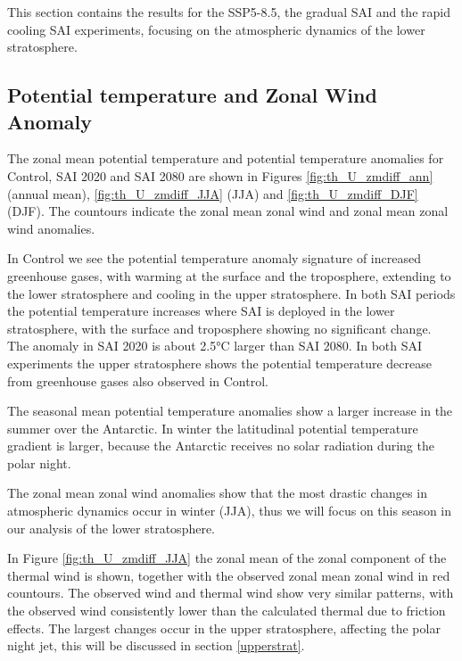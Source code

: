 This section contains the results for the SSP5-8.5, the gradual SAI and the rapid cooling SAI experiments, focusing on the atmospheric dynamics of the lower stratosphere.

\subsection{Potential temperature and Zonal Wind Anomaly}
The zonal mean potential temperature and potential temperature anomalies for Control, SAI 2020 and SAI 2080 are shown in Figures \ref{fig:th_U_zmdiff_ann} (annual mean), \ref{fig:th_U_zmdiff_JJA} (JJA) and \ref{fig:th_U_zmdiff_DJF} (DJF). The countours indicate the zonal mean zonal wind and zonal mean zonal wind anomalies. 

In Control we see the potential temperature anomaly signature of increased greenhouse gases, with warming at the surface and the troposphere, extending to the lower stratosphere and cooling in the upper stratosphere. In both SAI periods the potential temperature increases where SAI is deployed in the lower stratosphere, with the surface and troposphere showing no significant change. The anomaly in SAI 2020 is about 2.5°C larger than SAI 2080. In both SAI experiments the upper stratosphere shows the potential temperature decrease from greenhouse gases also observed in Control. 

The seasonal mean potential temperature anomalies show a larger increase in the summer over the Antarctic. In winter the latitudinal potential temperature gradient is larger, because the Antarctic receives no solar radiation during the polar night. 

The zonal mean zonal wind anomalies show that the most drastic changes in atmospheric dynamics occur in winter (JJA), thus we will focus on this season in our analysis of the lower stratosphere.

In Figure \ref{fig:th_U_zmdiff_JJA} the zonal mean of the zonal component of the thermal wind is shown, together with the observed zonal mean zonal wind in red countours. The observed wind and thermal wind show very similar patterns, with the observed wind consistently lower than the calculated thermal due to friction effects. The largest changes occur in the upper stratosphere, affecting the polar night jet, this will be discussed in section \ref{upperstrat}. 


